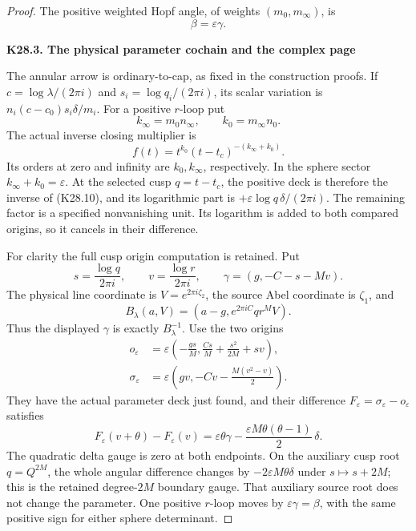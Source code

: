 \begin{proof}
The positive weighted Hopf angle, of weights
\((m_0,m_\infty)\), is
\[
                              \beta=\varepsilon\gamma.
 \tag{K28.9}
\]

\par

\medskip\noindent\textbf{K28.3. The physical parameter cochain and the complex page}

\par\nobreak

The annular arrow is ordinary-to-cap, as fixed in the construction proofs.
If \(c=\log\lambda/(2\pi i)\) and \(s_i=\log q_i/(2\pi i)\), its scalar
variation is \(n_i(c-c_0)s_i\delta/m_i\). For a positive \(r\)-loop put
\[
 k_\infty=m_0n_\infty,\qquad k_0=m_\infty n_0.
\]
The actual inverse closing multiplier is
\[
                      f(t)=t^{k_0}(t-t_c)^{-(k_\infty+k_0)}.
 \tag{K28.10}
\]
Its orders at zero and infinity are \(k_0,k_\infty\), respectively.
In the sphere sector \(k_\infty+k_0=\varepsilon\).
At the selected cusp \(q=t-t_c\), the positive deck is therefore the
inverse of (K28.10), and its logarithmic part is
\(+\varepsilon\log q\,\delta/(2\pi i)\).
The remaining factor is a specified nonvanishing unit. Its logarithm is
added to both compared origins, so it cancels in their difference.

For clarity the full cusp origin computation is retained. Put
\[
 s=\frac{\log q}{2\pi i},\qquad
 v=\frac{\log r}{2\pi i},\qquad
 \gamma=(g,-C-s-Mv).
\]
The physical line coordinate is \(V=e^{2\pi i\zeta_2}\), the source
Abel coordinate is \(\zeta_1\), and
\[
 B_\lambda(a,V)=(a-g,e^{2\pi iC}q r^M V).
\]
Thus the displayed \(\gamma\) is exactly \(B_\lambda^{-1}\).
Use the two origins
\[
 \begin{split}
 o_\varepsilon&=\varepsilon
       \left(-\frac{gs}{M},\frac{Cs}{M}+\frac{s^2}{2M}+sv\right),\\
 \sigma_\varepsilon&=\varepsilon
       \left(gv,-Cv-\frac{M(v^2-v)}2\right).
 \end{split}
 \tag{K28.11}
\]
They have the actual parameter deck just found, and their difference
\(F_\varepsilon=\sigma_\varepsilon-o_\varepsilon\) satisfies
\[
 F_\varepsilon(v+\theta)-F_\varepsilon(v)
   =\varepsilon\theta\gamma
      -\frac{\varepsilon M\theta(\theta-1)}2\,\delta .
 \tag{K28.12}
\]
The quadratic delta gauge is zero at both endpoints. On the auxiliary
cusp root \(q=Q^{2M}\), the whole angular difference changes by
\(-2\varepsilon M\theta\delta\) under \(s\mapsto s+2M\); this is the
retained degree-\(2M\) boundary gauge. That auxiliary source root does
not change the parameter. One positive \(r\)-loop moves by
\(\varepsilon\gamma=\beta\), with the same positive sign for either
sphere determinant.


\end{proof}
